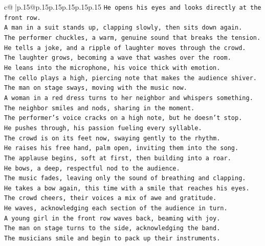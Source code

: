 \documentclass{article}
\begin{document}
{\begin{supertabular}{c@{$\;$}|p{.15\linewidth}@{}p{.15\linewidth}p{.15\linewidth}p{.15\linewidth}p{.15\linewidth}p{.15\linewidth}}
{{{\texttt{He opens his eyes and looks directly at the front row.  } \\
\texttt{A man in a suit stands up, clapping slowly, then sits down again.  } \\
\texttt{The performer chuckles, a warm, genuine sound that breaks the tension.  } \\
\texttt{He tells a joke, and a ripple of laughter moves through the crowd.  } \\
\texttt{The laughter grows, becoming a wave that washes over the room.  } \\
\texttt{He leans into the microphone, his voice thick with emotion.  } \\
\texttt{The cello plays a high, piercing note that makes the audience shiver.  } \\
\texttt{The man on stage sways, moving with the music now.  } \\
\texttt{A woman in a red dress turns to her neighbor and whispers something.  } \\
\texttt{The neighbor smiles and nods, sharing in the moment.  } \\
\texttt{The performer’s voice cracks on a high note, but he doesn’t stop.  } \\
\texttt{He pushes through, his passion fueling every syllable.  } \\
\texttt{The crowd is on its feet now, swaying gently to the rhythm.  } \\
\texttt{He raises his free hand, palm open, inviting them into the song.  } \\
\texttt{The applause begins, soft at first, then building into a roar.  } \\
\texttt{He bows, a deep, respectful nod to the audience.  } \\
\texttt{The music fades, leaving only the sound of breathing and clapping.  } \\
\texttt{He takes a bow again, this time with a smile that reaches his eyes.  } \\
\texttt{The crowd cheers, their voices a mix of awe and gratitude.  } \\
\texttt{He waves, acknowledging each section of the audience in turn.  } \\
\texttt{A young girl in the front row waves back, beaming with joy.  } \\
\texttt{The man on stage turns to the side, acknowledging the band.  } \\
\texttt{The musicians smile and begin to pack up their instruments.  } \\
}}}
\end{supertabular}}
\end{document}
